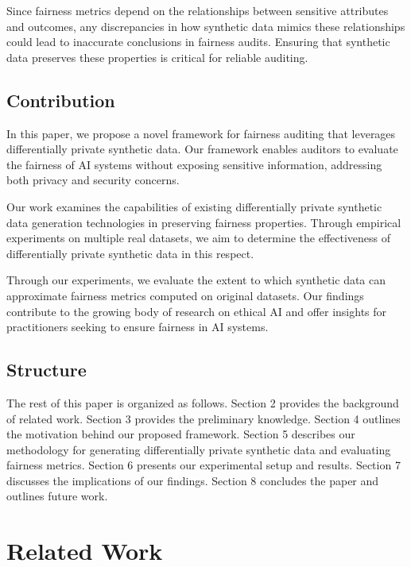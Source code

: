 \documentclass[manuscript,screen,review,anonymous]{acmart}
\begin{document}
Since fairness metrics depend on the relationships between sensitive attributes and outcomes, any discrepancies in how synthetic data mimics these relationships could lead to inaccurate conclusions in fairness audits. Ensuring that synthetic data preserves these properties is critical for reliable auditing.

\subsection{Contribution}


In this paper, we propose a novel framework for fairness auditing that leverages differentially private synthetic data. Our framework enables auditors to evaluate the fairness of AI systems without exposing sensitive information, addressing both privacy and security concerns.

Our work examines the capabilities of existing differentially private synthetic data generation technologies in preserving fairness properties. Through empirical experiments on multiple real datasets, we aim to determine the effectiveness of differentially private synthetic data in this respect.

Through our experiments, we evaluate the extent to which synthetic data can approximate fairness metrics computed on original datasets. Our findings contribute to the growing body of research on ethical AI and offer insights for practitioners seeking to ensure fairness in AI systems.

\subsection{Structure}

The rest of this paper is organized as follows. Section 2 provides the background of related work. Section 3 provides the preliminary knowledge. Section 4 outlines the motivation behind our proposed framework. Section 5 describes our methodology for generating differentially private synthetic data and evaluating fairness metrics. Section 6 presents our experimental setup and results. Section 7 discusses the implications of our findings. Section 8 concludes the paper and outlines future work.


\section{Related Work}
\end{document}
